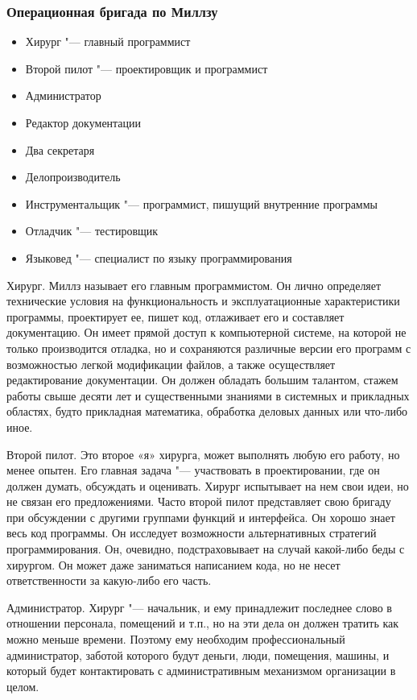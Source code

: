 \documentclass{../industrial-development}
\begin{document}
\begin{frame} \frametitle{Операционная бригада по Миллзу}
    \begin{itemize}
     \item Хирург "--- главный программист
     \item Второй пилот "--- проектировщик и программист
     \item Администратор
     \item Редактор документации
     \item Два секретаря
     \item Делопроизводитель
     \item Инструментальщик "--- программист, пишущий внутренние программы
     \item Отладчик "--- тестировщик
     \item Языковед "--- специалист по языку программирования
    \end{itemize}
\end{frame}

\lecturenotes

Хирург. Миллз называет его главным программистом. Он лично определяет технические условия на функциональность и эксплуатационные характеристики программы, проектирует ее, пишет код, отлаживает его и составляет документацию. Он имеет прямой доступ к компьютерной системе, на которой не только производится отладка, но и сохраняются различные версии его программ с возможностью легкой модификации файлов, а также осуществляет редактирование документации. Он должен обладать большим талантом, стажем работы свыше десяти лет и существенными знаниями в системных и прикладных областях, будто прикладная математика, обработка деловых данных или что-либо иное.

Второй пилот. Это второе «я» хирурга, может выполнять любую его работу, но менее опытен. Его главная задача "--- участвовать в проектировании, где он должен думать, обсуждать и оценивать. Хирург испытывает на нем свои идеи, но не связан его предложениями. Часто второй пилот представляет свою бригаду при обсуждении с другими группами функций и интерфейса. Он хорошо знает весь код программы. Он исследует возможности альтернативных стратегий программирования. Он, очевидно, подстраховывает на случай какой-либо беды с хирургом. Он может даже заниматься написанием кода, но не несет ответственности за какую-либо его часть.

Администратор. Хирург "--- начальник, и ему принадлежит последнее слово в отношении персонала, помещений и т.п., но на эти дела он должен тратить как можно меньше времени. Поэтому ему необходим профессиональный администратор, заботой которого будут деньги, люди, помещения, машины, и который будет контактировать с административным механизмом организации в целом.
\end{document}
